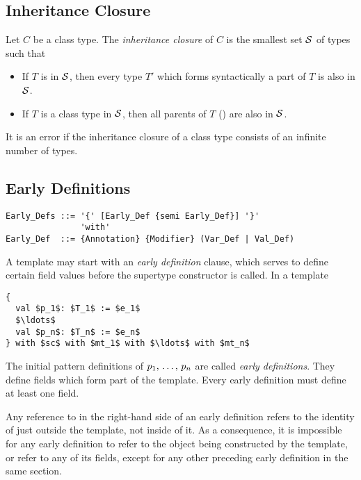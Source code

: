 \subsection{Inheritance Closure}
\label{sec:inheritance-closure}

\newcommand{\inheritclosure}{{\cal S}}

Let $C$ be a class type. The {\em inheritance closure} of $C$ is the smallest set $\inheritclosure$ of types such that
\begin{itemize}
\item If $T$ is in $\inheritclosure$, then every type $T'$ which forms syntactically a part of $T$ is also in $\inheritclosure$. 
\item If $T$ is a class type in $\inheritclosure$, then all parents of $T$ () are also in $\inheritclosure$. 
\end{itemize}
It is an error if the inheritance closure of a class type consists of an infinite number of types. 






\subsection{Early Definitions}
\label{sec:early-defs}

\syntax\begin{lstlisting}
Early_Defs ::= '{' [Early_Def {semi Early_Def}] '}' 
               'with'
Early_Def  ::= {Annotation} {Modifier} (Var_Def | Val_Def)
\end{lstlisting}

A template may start with an {\em early definition} clause, which serves to define certain field values before the supertype constructor is called. In a template
\begin{lstlisting}
{
  val $p_1$: $T_1$ := $e_1$
  $\ldots$
  val $p_n$: $T_n$ := $e_n$
} with $sc$ with $mt_1$ with $\ldots$ with $mt_n$
\end{lstlisting}
The initial pattern definitions of $p_1 ,\, \ldots ,\, p_n$ are called {\em early definitions}. They define fields which form part of the template. Every early definition must define at least one field. 

Any reference to  in the right-hand side of an early definition refers to the identity of  just outside the template, not inside of it. As a consequence, it is impossible for any early definition to refer to the object being constructed by the template, or refer to any of its fields, except for any other preceding early definition in the same section. 







